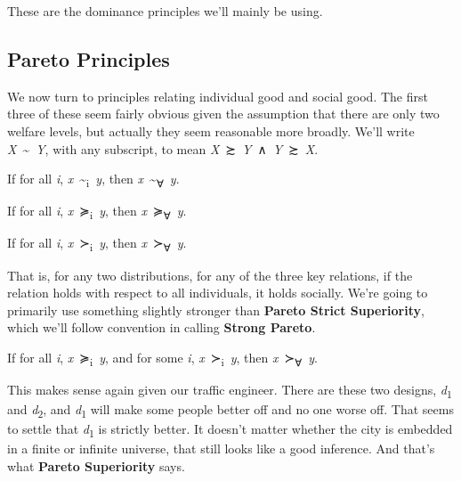 \documentclass[
  11pt,
  letterpaper,
  DIV=11,
  numbers=noendperiod,
  twoside]{scrartcl}
\providecommand{\tightlist}{%
  \setlength{\itemsep}{0pt}\setlength{\parskip}{0pt}}
\begin{document}
These are the dominance principles we'll mainly be using.

\subsection{Pareto Principles}\label{pareto-principles}

We now turn to principles relating individual good and social good. The
first three of these seem fairly obvious given the assumption that there
are only two welfare levels, but actually they seem reasonable more
broadly. We'll write \emph{X}~\textasciitilde~\emph{Y}, with any
subscript, to mean \emph{X}~≿~\emph{Y}~∧~\emph{Y}~≿~\emph{X}.

\begin{description}
\tightlist
\item[Pareto Indifference]
If for all \emph{i},
\emph{x}~\textasciitilde{}\textsubscript{i}~\emph{y}, then
\emph{x}~\textasciitilde{}\textsubscript{∀}~\emph{y}.
\item[Pareto Superiority]
If for all \emph{i}, \emph{x}~≽\textsubscript{i}~\emph{y}, then
\emph{x}~≽\textsubscript{∀}~\emph{y}.
\item[Pareto Strict Superiority]
If for all \emph{i}, \emph{x}~≻\textsubscript{i}~\emph{y}, then
\emph{x}~≻\textsubscript{∀}~\emph{y}.
\end{description}

That is, for any two distributions, for any of the three key relations,
if the relation holds with respect to all individuals, it holds
socially. We're going to primarily use something slightly stronger than
\textbf{Pareto Strict Superiority}, which we'll follow convention in
calling \textbf{Strong Pareto}.

\begin{description}
\tightlist
\item[Pareto Superiority]
If for all \emph{i}, \emph{x}~≽\textsubscript{i}~\emph{y}, and for some
\emph{i}, \emph{x}~≻\textsubscript{i}~\emph{y}, then
\emph{x}~≻\textsubscript{∀}~\emph{y}.
\end{description}

This makes sense again given our traffic engineer. There are these two
designs, \emph{d}\textsubscript{1} and \emph{d}\textsubscript{2}, and
\emph{d}\textsubscript{1} will make some people better off and no one
worse off. That seems to settle that \emph{d}\textsubscript{1} is
strictly better. It doesn't matter whether the city is embedded in a
finite or infinite universe, that still looks like a good inference. And
that's what \textbf{Pareto Superiority} says.
\end{document}

